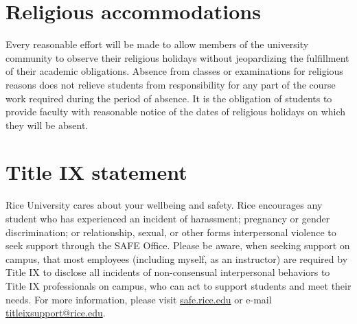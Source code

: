%
%
%
%

\section{Religious accommodations}

Every reasonable effort will be made to allow members of the university community to observe their religious holidays without jeopardizing the fulfillment of their academic obligations. Absence from classes or examinations for religious reasons does not relieve students from responsibility for any part of the course work required during the period of absence. It is the obligation of students to provide faculty with reasonable notice of the dates of religious holidays on which they will be absent. 




%
%
%
%

\section{Title IX statement}

Rice University cares about your wellbeing and safety. Rice encourages any student who has experienced an incident of harassment; pregnancy or gender discrimination; or relationship, sexual, or other forms interpersonal violence to seek support through the SAFE Office. Please be aware, when seeking support on campus, that most employees (including myself, as an instructor) are required by Title IX to disclose all incidents of non-consensual interpersonal behaviors to Title IX professionals on campus, who can act to support students and meet their needs. For more information, please visit \href{https://safe.rice.edu/}{safe.rice.edu} or e-mail \href{mailto:titleixsupport@rice.edu}{titleixsupport@rice.edu}.